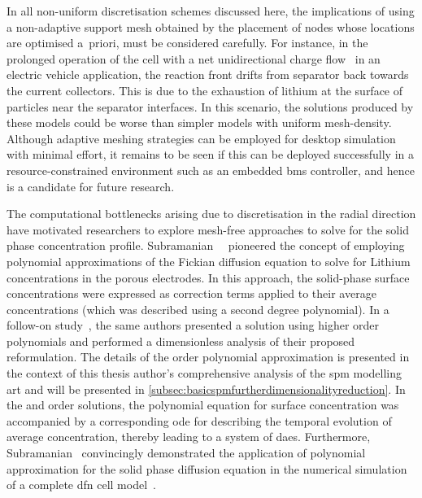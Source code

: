In all  non-uniform discretisation schemes  discussed here, the  implications of
using  a non-adaptive  support mesh  obtained by  the placement  of nodes  whose
locations are optimised a~priori, must be considered carefully. For instance, in
the prolonged operation of the cell with a net unidirectional charge flow \eg~in
an electric vehicle  application, the reaction front drifts  from separator back
towards the current collectors. This is due  to the exhaustion of lithium at the
surface  of particles  near  the  separator interfaces.  In  this scenario,  the
solutions  produced by  these models  could be  worse than  simpler models  with
uniform mesh-density. Although  adaptive meshing strategies can  be employed for
desktop simulation  with minimal effort,  it remains to be  seen if this  can be
deployed successfully in a resource-constrained  environment such as an embedded
\gls{bms} controller, and hence is  a candidate for future research.


The   computational   bottlenecks  arising   due   to   discretisation  in   the
radial   direction    have   motivated   researchers   to    explore   mesh-free
approaches   to    solve   for   the   solid    phase   concentration   profile.
Subramanian~\etal~\cite{Subramanian2004}  pioneered  the  concept  of  employing
polynomial approximations of the Fickian diffusion equation to solve for Lithium
concentrations  in the  porous  electrodes. In  this  approach, the  solid-phase
surface  concentrations were  expressed  as correction  terms  applied to  their
average concentrations (which  was described using a  second degree polynomial).
In  a   follow-on  study~\cite{Subramanian2005},  the  same   authors  presented
a  solution  using  higher  order  polynomials  and  performed  a  dimensionless
analysis of  their proposed reformulation.  The details of  the 
order  polynomial approximation  is  presented  in the  context  of this  thesis
author's  comprehensive  analysis  of  the  \gls{spm}  modelling  art  and  will
be  presented  in \cref{subsec:basicspmfurtherdimensionalityreduction}.  In  the
 and   order solutions, the  polynomial equation
for  surface concentration  was  accompanied by  a  corresponding \gls{ode}  for
describing  the temporal  evolution  of average  concentration, thereby  leading
to  a  system  of  \glspl{dae}.  Furthermore,  Subramanian~\etal{}  convincingly
demonstrated the  application of  polynomial approximation  for the  solid phase
diffusion  equation in  the numerical  simulation of  a complete  \gls{dfn} cell
model~\cite{Subramanian2007}.


